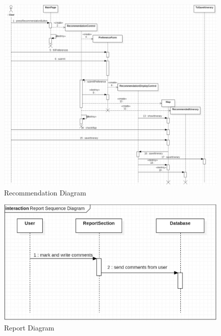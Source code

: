 \documentclass[10pt]{article}
\begin{document}
\begin{figure}[H]
	\centering
	\includegraphics[width=14cm]{recommendation.png} 
	\caption{Recommendation Diagram}
	\label{Recommendation Sequence Diagram}
\end{figure}

\begin{figure}[H]
	\centering
	\includegraphics[width=14cm]{report.jpg} 
	\caption{Report Diagram}
	\label{Report Sequence Diagram}
\end{figure}
\end{document}

